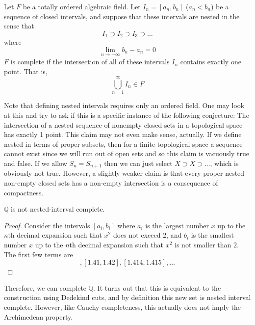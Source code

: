 \documentclass{article}
\begin{document}
      \begin{definition}
        Let $F$ be a totally ordered algebraic field. Let $I_n= [a_n, b_n]$ ($a_n < b_n$) be a sequence of closed intervals, and suppose that these intervals are nested in the sense that
        \[I_1 \supset I_2 \supset I_3 \supset \ldots\]
        where 
        \[\lim_{n \rightarrow + \infty} b_n - a_n = 0\]
        $F$ is complete if the intersection of all of these intervals $I_n$ contains exactly one point. That is, 
        \[\bigcup_{n=1}^\infty I_n \in F\]
      \end{definition}

      Note that defining nested intervals requires only an ordered field. One may look at this and try to ask if this is a specific instance of the following conjecture: The intersection of a nested sequence of nonempty closed sets in a topological space has exactly 1 point. This claim may not even make sense, actually. If we define nested in terms of proper subsets, then for a finite topological space a sequence cannot exist since we will run out of open sets and so this claim is vacuously true and false. If we allow $S_n = S_{n+1}$ then we can just select $X \supset X \supset \ldots$, which is obviously not true. However, a slightly weaker claim is that every proper nested non-empty closed sets has a non-empty intersection is a consequence of compactness. 

      \begin{theorem}
        $\mathbb{Q}$ is not nested-interval complete. 
      \end{theorem}
      \begin{proof}
        Consider the intervals $[a_i, b_i]$ where $a_i$ is the largest number $x$ up to the $n$th decimal expansion such that $x^2$ does not exceed $2$, and $b_i$ is the smallest number $x$ up to the $n$th decimal expansion such that $x^2$ is not smaller than $2$. The first few terms are 
        \begin{equation}
          [1.4, 1.5], [1.41, 1.42], [1.414, 1.415], \ldots
        \end{equation}
      \end{proof}

      Therefore, we can complete $\mathbb{Q}$. It turns out that this is equivalent to the construction using Dedekind cuts, and by definition this new set is nested interval complete. However, like Cauchy completeness, this actually does not imply the Archimedean property. 
\end{document}
